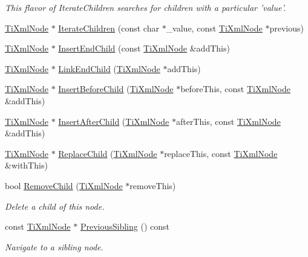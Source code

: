 \begin{DoxyCompactItemize}
\begin{DoxyCompactList}\small\item\em This flavor of Iterate\+Children searches for children with a particular 'value'. \end{DoxyCompactList}\item 
\hyperlink{class_ti_xml_node}{Ti\+Xml\+Node} $\ast$ \hyperlink{class_ti_xml_node_a67ba8275e533e6f76340236c42ea0aea}{Iterate\+Children} (const char $\ast$\+\_\+value, const \hyperlink{class_ti_xml_node}{Ti\+Xml\+Node} $\ast$previous)
\item 
\hyperlink{class_ti_xml_node}{Ti\+Xml\+Node} $\ast$ \hyperlink{class_ti_xml_node_af287a913ce46d8dbf7ef24fec69bbaf0}{Insert\+End\+Child} (const \hyperlink{class_ti_xml_node}{Ti\+Xml\+Node} \&add\+This)
\item 
\hyperlink{class_ti_xml_node}{Ti\+Xml\+Node} $\ast$ \hyperlink{class_ti_xml_node_a1a881212554b759865f6cac79a851d38}{Link\+End\+Child} (\hyperlink{class_ti_xml_node}{Ti\+Xml\+Node} $\ast$add\+This)
\item 
\hyperlink{class_ti_xml_node}{Ti\+Xml\+Node} $\ast$ \hyperlink{class_ti_xml_node_a71e54e393336382bc9875f64aab5cb15}{Insert\+Before\+Child} (\hyperlink{class_ti_xml_node}{Ti\+Xml\+Node} $\ast$before\+This, const \hyperlink{class_ti_xml_node}{Ti\+Xml\+Node} \&add\+This)
\item 
\hyperlink{class_ti_xml_node}{Ti\+Xml\+Node} $\ast$ \hyperlink{class_ti_xml_node_a274db3292218202805c093f66a964cb5}{Insert\+After\+Child} (\hyperlink{class_ti_xml_node}{Ti\+Xml\+Node} $\ast$after\+This, const \hyperlink{class_ti_xml_node}{Ti\+Xml\+Node} \&add\+This)
\item 
\hyperlink{class_ti_xml_node}{Ti\+Xml\+Node} $\ast$ \hyperlink{class_ti_xml_node_a543208c2c801c84a213529541e904b9f}{Replace\+Child} (\hyperlink{class_ti_xml_node}{Ti\+Xml\+Node} $\ast$replace\+This, const \hyperlink{class_ti_xml_node}{Ti\+Xml\+Node} \&with\+This)
\item 
bool \hyperlink{class_ti_xml_node_ae19d8510efc90596552f4feeac9a8fbf}{Remove\+Child} (\hyperlink{class_ti_xml_node}{Ti\+Xml\+Node} $\ast$remove\+This)
\begin{DoxyCompactList}\small\item\em Delete a child of this node. \end{DoxyCompactList}\item 
const \hyperlink{class_ti_xml_node}{Ti\+Xml\+Node} $\ast$ \hyperlink{class_ti_xml_node_ac2cd892768726270e511b2ab32de4d10}{Previous\+Sibling} () const 
\begin{DoxyCompactList}\small\item\em Navigate to a sibling node. \end{DoxyCompactList}\item 

\end{DoxyCompactItemize}

